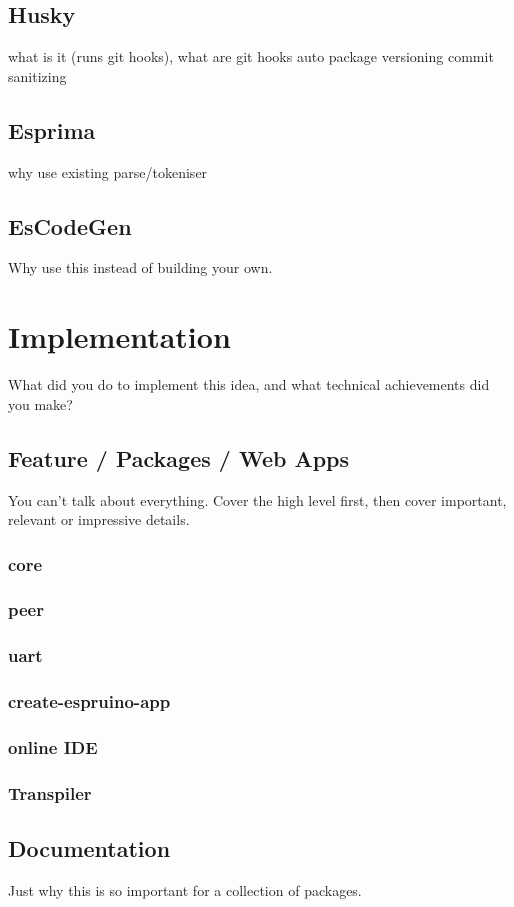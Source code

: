 \documentclass{l4proj}
\begin{document}
\section{Husky}
\text what is it (runs git hooks), what are git hooks
auto package versioning
commit sanitizing
\section{Esprima}
\text why use existing parse/tokeniser
\section{EsCodeGen}
\text Why use this instead of building your own.
\chapter{Implementation}
What did you do to implement this idea, and what technical achievements did you make?
\section{Feature / Packages / Web Apps}
You can't talk about everything. Cover the high level first, then cover important, relevant or impressive details.
\subsection{core}
\subsection{peer}
\subsection{uart}
\subsection{create-espruino-app}
\subsection{online IDE}
\subsection{Transpiler}

\section{Documentation}
\text Just why this is so important for a collection of packages.
\end{document}
